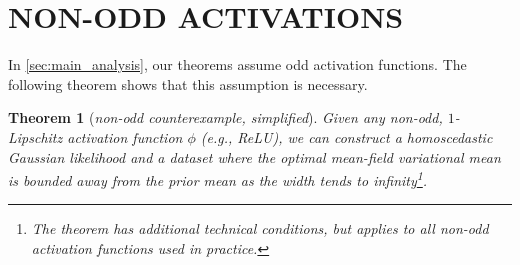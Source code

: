 \documentclass[twoside]{article}
\renewcommand{\ss}[1]{_{\text{#1}}}
\newcommand{\vf}{\mathbf{f}}
\newcommand{\vx}{\mathbf{x}}
\newcommand{\vz}{\mathbf{z}}
\newcommand{\mW}{\mathbf{W}}
\newcommand{\E}{\mathbb{E}}
\renewcommand{\P}{\mathbb{P}}
\newcommand{\Q}{\mathbb{Q}}
\renewcommand{\Q}{\ensuremath{Q}}
\renewcommand{\P}{\ensuremath{P}}
\newcommand{\KL}{\operatorname{KL}}
\renewcommand{\ss}[1]{_{\text{#1}}}        %
\DeclarePairedDelimiter\norm{\|}{\|}             %
\theoremstyle{theoremstyle}
\newtheorem{theorem}{Theorem}
\begin{document}






\section{NON-ODD ACTIVATIONS} \label{sec:counterexample}

In \cref{sec:main_analysis}, our theorems  assume odd activation functions. The following theorem shows that this assumption is necessary.
\begin{theorem}[\emph{non-odd counterexample, simplified}] \label{thm:counterexample}
Given any non-odd, $1$-Lipschitz activation function $\phi$ (e.g., ReLU), we can construct a homoscedastic Gaussian likelihood and a dataset where the optimal mean-field variational mean is bounded away from the prior mean as the width tends to infinity\footnote{The theorem has additional technical conditions, but applies to all non-odd activation functions used in practice.}.
\end{theorem}
\end{document}
